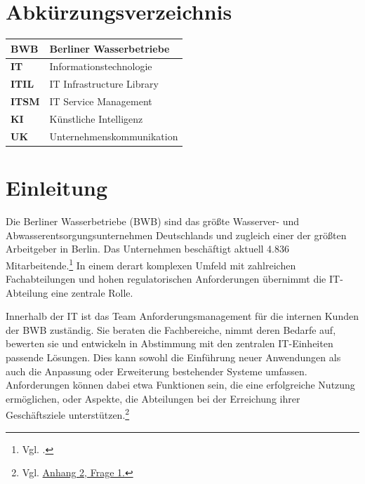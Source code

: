 \documentclass[
    12pt, 
    a4paper,
    ]{scrartcl} %
\begin{document}
\clearpage
{}
{}
\section*{Abkürzungsverzeichnis}
\vspace{0.6cm}
\begin{tabular}{p{4cm} p{11.35cm}}   
    \textbf{\normalsize BWB} & \normalsize Berliner Wasserbetriebe \\[0.5cm]
    \hline
    \textbf{\normalsize IT} & \normalsize Informationstechnologie \\[0.5cm]
    \hline
    \textbf{\normalsize ITIL} & \normalsize IT Infrastructure Library \\[0.5cm]
    \hline
    \textbf{\normalsize ITSM} & \normalsize IT Service Management \\[0.5cm]
    \hline
    \textbf{\normalsize KI} & \normalsize Künstliche Intelligenz \\[0.5cm] 
    \hline
    \textbf{\normalsize UK} & \normalsize Unternehmenskommunikation \\[0.5cm] 
\end{tabular}

\newpage
{} %
\setcounter{page}{1}
\section{Einleitung}

Die Berliner Wasserbetriebe (BWB) sind das größte Wasserver- und Abwasserentsorgungsunternehmen Deutschlands und zugleich einer der größten Arbeitgeber in Berlin. Das Unternehmen beschäftigt aktuell 4.836 Mitarbeitende.\footnote{Vgl. \cite{S_BWB}.} In einem derart komplexen Umfeld mit zahlreichen Fachabteilungen und hohen regulatorischen Anforderungen übernimmt die IT-Abteilung eine zentrale Rolle.

Innerhalb der IT ist das Team Anforderungsmanagement für die internen Kunden der BWB zuständig. Sie beraten die Fachbereiche, nimmt deren Bedarfe auf, bewerten sie und entwickeln in Abstimmung mit den zentralen IT-Einheiten passende Lösungen. Dies kann sowohl die Einführung neuer Anwendungen als auch die Anpassung oder Erweiterung bestehender Systeme umfassen. Anforderungen können dabei etwa Funktionen sein, die eine erfolgreiche Nutzung ermöglichen, oder Aspekte, die Abteilungen bei der Erreichung ihrer Geschäftsziele unterstützen.\footnote{Vgl. \hyperref[sec:Anhang2]{Anhang 2, Frage 1.}}
\end{document}
